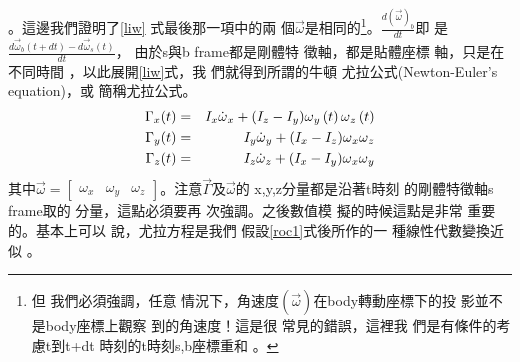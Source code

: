 \documentclass[12pt,twoside]{article}
\begin{document}
。這邊我們證明了\ref{liw}%
式最後那一項中的兩%
個$\vec{\omega}$是相同的\footnote{但%
我們必須強調，任意%
情況下，角速度$\left( \vec{\omega}%
\right) $在body轉動座標下的投%
影並不是body座標上觀察%
到的角速度！這是很%
常見的錯誤，這裡我%
們是有條件的考慮t到t+dt%
時刻的t時刻s,b座標重和%
。}。$\frac{d\left( \vec{\omega}\right) _{b}}{dt}$即%
是$\frac{d\vec{\omega}_{b}(t+dt)-d\vec{\omega}_{s}(t)}{dt}$，%
由於s與b frame都是剛體特%
徵軸，都是貼體座標%
軸，只是在不同時間%
，以此展開\ref{liw}式，我%
們就得到所謂的牛頓%
尤拉公式(Newton-Euler's equation)，或%
簡稱尤拉公式。%
\begin{eqnarray}
\Gamma _{x}(t) &=&I_{x}\dot{\omega}_{x}+(I_{z}-I_{y})\omega _{y}\left(
t\right) \omega _{z}\left( t\right)  \notag \\
\Gamma _{y}(t) &=&I_{y}\dot{\omega}_{y}+(I_{x}-I_{z})\omega _{x}\omega _{z}
\label{eulereqbody} \\
\Gamma _{z}(t) &=&I_{z}\dot{\omega}_{z}+(I_{x}-I_{y})\omega _{x}\omega _{y} 
\notag
\end{eqnarray}%
其中$\vec{\omega}=\left[ 
\begin{array}{ccc}
\omega _{x} & \omega _{y} & \omega _{z}%
\end{array}%
\right] $。注意$\vec{\Gamma}$及$\vec{\omega}$的%
x,y,z分量都是沿著t時刻%
的剛體特徵軸s frame取的%
分量，這點必須要再%
次強調。之後數值模%
擬的時候這點是非常%
重要的。基本上可以%
說，尤拉方程是我們%
假設\ref{roc1}式後所作的一%
種線性代數變換近似%
。

\bigskip
\end{document}
